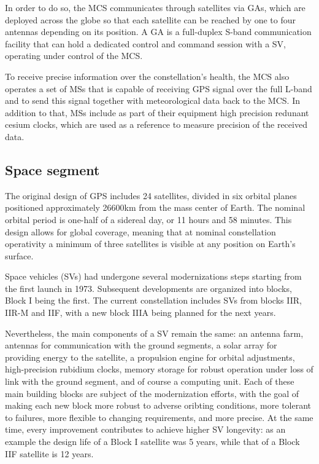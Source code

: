 In order to do so, the MCS communicates through satellites via GAs, which are
deployed across the globe so that each satellite can be reached by one to four
antennas depending on its position. A GA is a full-duplex S-band communication
facility that can hold a dedicated control and command session with a SV,
operating under control of the MCS.

To receive precise information over the constellation's health, the MCS also
operates a set of MSs that is capable of receiving GPS signal over the full
L-band and to send this signal together with meteorological data back to the
MCS. In addition to that, MSs include as part of their equipment high precision
redunant cesium clocks, which are used as a reference to measure precision of
the received data.

\subsection{Space segment}
The original design of GPS includes 24 satellites, divided in six orbital
planes positioned approximately \num{26600}\si{km} from the mass center of
Earth. The nominal orbital period is one-half of a sidereal day, or 11 hours and
58 minutes. This design allows for global coverage, meaning that at nominal
constellation operativity a minimum of three satellites is visible at any
position on Earth's surface.

Space vehicles (SVs) had undergone several modernizations steps starting from
the first launch in 1973. Subsequent developments are organized into blocks,
Block I being the first. The current constellation includes SVs from blocks IIR,
IIR-M and IIF, with a new block IIIA being planned for the next years.

Nevertheless, the main components of a SV remain the same: an antenna farm,
antennas for communication with the ground segments, a solar array for providing
energy to the satellite, a propulsion engine for orbital adjustments,
high-precision rubidium clocks, memory storage for robust operation under loss
of link with the ground segment, and of course a computing unit. Each of these
main building blocks are subject of the modernization efforts, with the goal of
making each new block more robust to adverse oribting conditions, more tolerant
to failures, more flexible to changing requirements, and more precise. At the
same time, every improvement contributes to achieve higher SV longevity: as an
example the design life of a Block I satellite was 5 years, while that of a
Block IIF satellite is 12 years.

